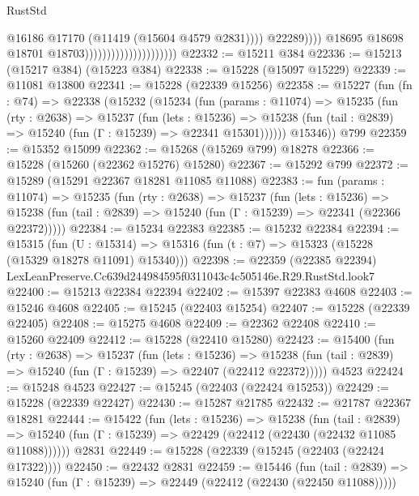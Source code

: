 \begin{lexlean}{RustStd}
\begin{coremodule}
                                                          @16186
                                                          @17170
                                                          (@11419 (@15604 @4579 @2831))))
                                                      @22289))))
                                              @18695
                                              @18698
                                              @18701
                                              @18703)))))))))))))))))))))
@22332 := @15211 @384
@22336 := @15213 (@15217 @384) (@15223 @384)
@22338 := @15228 (@15097 @15229)
@22339 := @11081 @13800
@22341 := @15228 (@22339 @15256)
@22358 := @15227
    (fun (fn : @74) =>
    @22338
      (@15232
        (@15234
          (fun (params : @11074) =>
          @15235
            (fun (rty : @2638) =>
            @15237
              (fun (lets : @15236) =>
              @15238 (fun (tail : @2839) => @15240 (fun (Γ : @15239) => @22341 @15301))))))
        @15346))
    @799
@22359 := @15352 @15099
@22362 := @15268 (@15269 @799) @18278
@22366 := @15228 (@15260 (@22362 @15276) @15280)
@22367 := @15292 @799
@22372 := @15289 (@15291 @22367 @18281 @11085 @11088)
@22383 := fun (params : @11074) =>
  @15235
    (fun (rty : @2638) =>
    @15237
      (fun (lets : @15236) =>
      @15238 (fun (tail : @2839) => @15240 (fun (Γ : @15239) => @22341 (@22366 @22372)))))
@22384 := @15234 @22383
@22385 := @15232 @22384
@22394 := @15315
    (fun (U : @15314) => @15316 (fun (t : @7) => @15323 (@15228 (@15329 @18278 @11091) @15340)))
@22398 := @22359 (@22385 @22394) LexLeanPreserve.Cc639d244984595f0311043c4c505146e.R29.RustStd.look7
@22400 := @15213 @22384 @22394
@22402 := @15397 @22383 @4608
@22403 := @15246 @4608
@22405 := @15245 (@22403 @15254)
@22407 := @15228 (@22339 @22405)
@22408 := @15275 @4608
@22409 := @22362 @22408
@22410 := @15260 @22409
@22412 := @15228 (@22410 @15280)
@22423 := @15400
    (fun (rty : @2638) =>
    @15237
      (fun (lets : @15236) =>
      @15238 (fun (tail : @2839) => @15240 (fun (Γ : @15239) => @22407 (@22412 @22372)))))
    @4523
@22424 := @15248 @4523
@22427 := @15245 (@22403 (@22424 @15253))
@22429 := @15228 (@22339 @22427)
@22430 := @15287 @21785
@22432 := @21787 @22367 @18281
@22444 := @15422
    (fun (lets : @15236) =>
    @15238
      (fun (tail : @2839) =>
      @15240 (fun (Γ : @15239) => @22429 (@22412 (@22430 (@22432 @11085 @11088))))))
    @2831
@22449 := @15228 (@22339 (@15245 (@22403 (@22424 @17322))))
@22450 := @22432 @2831
@22459 := @15446
    (fun (tail : @2839) => @15240 (fun (Γ : @15239) => @22449 (@22412 (@22430 (@22450 @11088)))))

\end{coremodule}
\end{lexlean}
